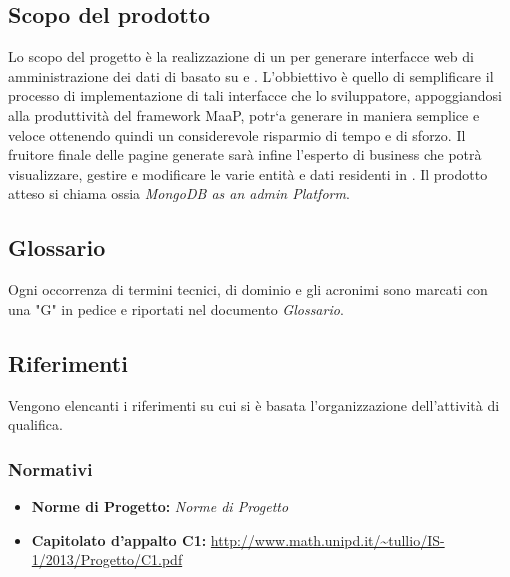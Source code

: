 \subsection{Scopo del prodotto}
Lo scopo del progetto è la realizzazione di un  per generare interfacce web di amministrazione dei dati di  basato su   e . L'obbiettivo è quello di semplificare il processo di implementazione di tali interfacce che lo sviluppatore, appoggiandosi alla produttività del framework MaaP, potr`a generare in maniera semplice e veloce ottenendo quindi un considerevole risparmio di tempo e di sforzo. Il fruitore finale delle pagine generate sarà infine l'esperto di business che potrà visualizzare, gestire e modificare le varie entità e dati residenti in .
Il prodotto atteso si chiama  ossia \emph{MongoDB as an admin Platform}. 

\subsection{Glossario}
Ogni occorrenza di termini tecnici, di dominio e gli acronimi sono marcati con una "G" in pedice e riportati nel documento \emph{Glossario}.

\subsection{Riferimenti}
Vengono elencanti i riferimenti su cui si è basata l'organizzazione dell'attività di qualifica.
	\subsubsection{Normativi}
		\begin{itemize}
  			\item \textbf{Norme di Progetto:}  \emph{Norme di Progetto}
			\item \textbf{Capitolato d'appalto C1:} \url{http://www.math.unipd.it/~tullio/IS-1/2013/Progetto/C1.pdf}
		\end{itemize}
